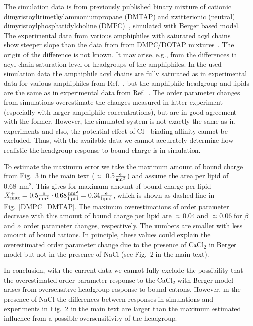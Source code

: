 \documentclass[twoside,twocolumn,9pt]{article}
\begin{document}
The simulation data is from previously published binary mixture of cationic dimyristoyltrimethylammoniumpropane (DMTAP) 
and zwitterionic (neutral) dimyristoylphosphatidylcholine (DMPC)~\cite{miettinen09,DMPC_DMTAP0mol,DMPC_DMTAP6mol,DMPC_DMTAP50mol},
simulated with Berger based model. The experimental data from various amphiphiles with saturated acyl chains~\cite{scherer89} show
steeper slope than the data from from DMPC/DOTAP mixtures~\cite{franzin98}. The origin of the difference is not known. 
It may arise, e.g., from the differences in acyl chain saturation level or headgroups of the amphiphiles.
In the used simulation data the amphiphile acyl chains are fully saturated as in experimental data for various 
amphiphiles from Ref.~, but the amphiphile headgroup and lipids are the same as in experimental data 
from Ref.~. The order parameter changes from simulations overestimate the changes measured in latter experiment
(especially with larger amphiphile concentrations), but are in good agreement with the former. However, the simulated
system is not exactly the same as in experiments and also, the potential effect of Cl$^-$ binding affinity cannot be excluded.
Thus, with the available data we cannot accurately determine how realistic the headgroup response to bound charge is in simulation. 

To estimate the maximum error we take the maximum amount of bound charge from Fig.~3 in the main text ($\approx$ 0.5$\frac{\rm e}{\rm nm^2}$)
and assume the area per lipid of 0.68~nm$^2$. This gives for maximum amount of bound 
charge per lipid $X^+_{\rm max}=0.5\frac{\rm e}{\rm nm^2}\cdot 0.68\frac{\rm nm^2}{\rm lipid}=0.34\frac{\rm e}{\rm lipid}$,
which is shown as dashed line in Fig.~\ref{DMPC_DMTAP}. The maximum
overestimations of order parameter decrease with this amount of bound charge per lipid are $\approx$0.04 and $\approx$0.06 for $\beta$ and $\alpha$ order parameter changes, respectively.
The numbers are smaller with less amount of bound cations. In principle,
these values could explain the overestimated order parameter change due to the presence of CaCl$_2$ in Berger model but not in the presence
of NaCl (see Fig.~2 in the main text).

In conclusion, with the current data we cannot fully exclude the possibility that the overestimated order parameter response to the
CaCl$_2$ with Berger model arises from oversensitive headgroup response to bound cations. However, in the presence of NaCl
the differences between responses in simulations and experiments in Fig.~2 in the main text are larger than the maximum estimated 
influence from a possible oversensitivity of the headgroup. 
\end{document}
